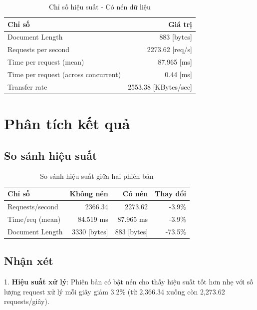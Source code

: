 \begin{table}[H]
    \centering
    \caption{Chỉ số hiệu suất - Có nén dữ liệu}
    \begin{tabular}{|l|r|}
    \hline
    \textbf{Chỉ số} & \textbf{Giá trị} \\
    \hline
    Document Length & 883 [bytes] \\
    Requests per second & 2273.62 [req/s] \\
    Time per request (mean) & 87.965 [ms] \\
    Time per request (across concurrent) & 0.44 [ms] \\
    Transfer rate & 2553.38 [KBytes/sec] \\
    \hline
    \end{tabular}
    \label{tab:compress}
\end{table}

\section{Phân tích kết quả}

\subsection{So sánh hiệu suất}

\begin{table}[H]
    \centering
    \caption{So sánh hiệu suất giữa hai phiên bản}
    \begin{tabular}{|l|r|r|r|}
    \hline
    \textbf{Chỉ số} & \textbf{Không nén} & \textbf{Có nén} & \textbf{Thay đổi} \\
    \hline
    Requests/second & 2366.34 & 2273.62 & -3.9\% \\
    Time/req (mean) & 84.519 ms & 87.965 ms & -3.9\% \\
    Document Length & 3330 [bytes] & 883 [bytes] & -73.5\% \\
    \hline
    \end{tabular}
    \label{tab:comparison}
\end{table}

\subsection{Nhận xét}

1. \textbf{Hiệu suất xử lý}: Phiên bản có bật nén cho thấy hiệu suất tốt hơn nhẹ với số lượng request xử lý mỗi giây giảm 3.2\% (từ 2,366.34 xuống còn 2,273.62 requests/giây).

